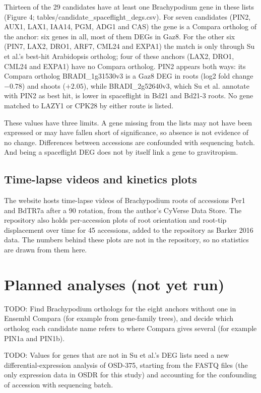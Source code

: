 \documentclass[sn-mathphys-num,Basic]{sn-jnl}
\begin{document}
Thirteen of the 29 candidates have at least one Brachypodium gene in these lists (Figure 4; tables/candidate\_spaceflight\_degs.csv). For seven candidates (PIN2, AUX1, LAX1, IAA14, PGM, ADG1 and CAS) the gene is a Compara ortholog of the anchor: six genes in all, most of them DEGs in Gaz8. For the other six (PIN7, LAX2, DRO1, ARF7, CML24 and EXPA1) the match is only through Su et al.'s best-hit Arabidopsis ortholog; four of these anchors (LAX2, DRO1, CML24 and EXPA1) have no Compara ortholog. PIN2 appears both ways: its Compara ortholog BRADI\_1g31530v3 is a Gaz8 DEG in roots (log2 fold change $-0.78$) and shoots ($+2.05$), while BRADI\_2g52640v3, which Su et al. annotate with PIN2 as best hit, is lower in spaceflight in Bd21 and Bd21-3 roots. No gene matched to LAZY1 or CPK28 by either route is listed.

These values have three limits. A gene missing from the lists may not have been expressed or may have fallen short of significance, so absence is not evidence of no change. Differences between accessions are confounded with sequencing batch. And being a spaceflight DEG does not by itself link a gene to gravitropism.

\subsection{Time-lapse videos and kinetics plots}

The website hosts time-lapse videos of Brachypodium roots of accessions Per1 and BdTR7a after a 90\textdegree{} rotation, from the author's CyVerse Data Store. The repository also holds per-accession plots of root orientation and root-tip displacement over time for 45 accessions, added to the repository as Barker 2016 data. The numbers behind these plots are not in the repository, so no statistics are drawn from them here.

\section{Planned analyses (not yet run)}

TODO: Find Brachypodium orthologs for the eight anchors without one in Ensembl Compara (for example from gene-family trees), and decide which ortholog each candidate name refers to where Compara gives several (for example PIN1a and PIN1b).

TODO: Values for genes that are not in Su et al.'s DEG lists need a new differential-expression analysis of OSD-375, starting from the FASTQ files (the only expression data in OSDR for this study) and accounting for the confounding of accession with sequencing batch.
\end{document}
